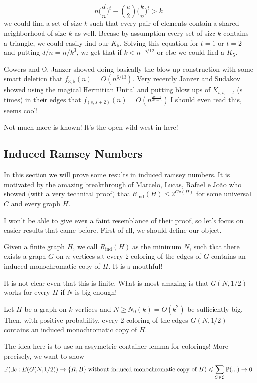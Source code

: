 \[
	n\bigg(\frac{d}{n}\bigg)^t - \binom{n}{2}\bigg(\frac{k}{n}\bigg)^t > k
\]
we could find a set of size $k$ such that every pair of elements
contain a shared neighborhood of size $k$ as well.
Becase by assumption every set of size $k$ contains a triangle, we
could easily find our $K_5$. Solving this equation for $t = 1$ or $t
= 2$ and putting $d/n = n/k^3$,
we get that if $k < n^{-5/12}$ or else we could find a $K_5$.

Gowers and O. Janzer showed doing basically the blow up construction
with some smart deletion
that $f_{3,5}(n) = O(n^{6/13})$. Very recently Janzer and Sudakov
showed using the magical Hermitian
Unital and putting blow ups of $K_{t,t,\dots, t}$ (s times) in their
edges that $f_(s, s+2)(n) = O(n^{\frac{2s-3}{4s - 5}})$
I should even read this, seems cool!

Not much more is known! It's the open wild west in here!

\subsection{Induced Ramsey Numbers}

In this section we will prove some results in induced ramsey numbers.
It is motivated by
the amazing breakthrough of Marcelo, Lucas, Rafael e João who showed
(with a very technical proof)
that $R_{\text{ind}}(H) \leq 2^{Cv(H)}$ for some universal $C$ and
every graph $H$.

I won't be able to give even a faint resemblance of their proof, so let's focus
on easier results that came before. First of all, we should define our object.

Given a finite graph $H$, we call $R_{\text{ind}}(H)$ as the minimum $N$,
such that there exists a graph $G$ on $n$ vertices s.t every $2$-coloring
of the edges of $G$ contains an induced monochromatic copy of $H$. It
is a mouthful!

It is not clear even that this is finite. What is most amazing is
that $G(N,1/2)$ works for every $H$
if $N$ is big enough!

\begin{theorem}
	Let $H$ be a graph on $k$ vertices and $N \geq N_0(k) = O(k^2)$ be
	sufficiently big. Then, with positive probability,
	every $2$-coloring of the edges $G(N,1/2)$ contains an induced
	monochromatic copy of $H$.
\end{theorem}

The idea here is to use an assymetric container lemma for colorings!
More precisely, we want to show
\[
	\mathbb{P}(\exists c : E(G(N,1/2)) \rightarrow \{R,B\} \text { without induced
	monochromatic copy of } H)
	\leqslant \sum_{C \in \mathcal{C}} \mathbb{P}(...) \rightarrow 0
\]

